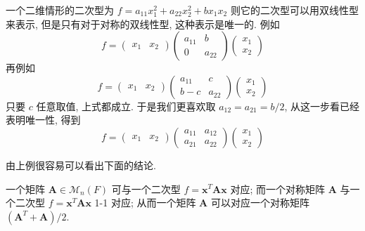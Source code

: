 \documentclass[UTF8]{book}
\begin{document}
\begin{example}
    一个二维情形的二次型为 $f=a_{11} x_1^2 + a_{22} x_2^2 + b x_1x_2$ 
    则它的二次型可以用双线性型来表示, 但是只有对于对称的双线性型, 
    这种表示是唯一的. 
    例如 
    \begin{equation*}
        f = 
        \begin{pmatrix}
            x_1 & x_2  
        \end{pmatrix}
        \begin{pmatrix}
            a_{11} & b \\
            0    & a_{22} 
        \end{pmatrix}
        \begin{pmatrix}
            x_1 \\
            x_2
        \end{pmatrix}
    \end{equation*}
    再例如 
    \begin{equation*}
        f = 
        \begin{pmatrix}
            x_1 & x_2  
        \end{pmatrix}
        \begin{pmatrix}
            a_{11} & c \\
            b-c    & a_{22} 
        \end{pmatrix}
        \begin{pmatrix}
            x_1 \\
            x_2
        \end{pmatrix}
    \end{equation*}
    只要 $c$ 任意取值, 上式都成立. 
    于是我们更喜欢取 $a_{12} = a_{21} = b/2$, 从这一步看已经表明唯一性, 
    得到 
    \begin{equation*}
        f = 
        \begin{pmatrix}
            x_1 & x_2  
        \end{pmatrix}
        \begin{pmatrix}
            a_{11} & a_{12} \\
            a_{21}    & a_{22} 
        \end{pmatrix}
        \begin{pmatrix}
            x_1 \\
            x_2
        \end{pmatrix}
    \end{equation*}
\end{example}

由上例很容易可以看出下面的结论. 
\begin{theorem}
    一个矩阵 $\boldsymbol{A} \in \mathcal{M}_n(F)$ 
    可与一个二次型 $ f = \boldsymbol{x}^T\boldsymbol{A}\boldsymbol{x}$ 
    对应; 
    而一个对称矩阵 $\boldsymbol{A}$ 与一个二次型 
    $ f = \boldsymbol{x}^T\boldsymbol{A}\boldsymbol{x}$ 1-1 对应; 
    从而一个矩阵 $\boldsymbol{A}$ 
    可以对应一个对称矩阵 $(\boldsymbol{A}^T +\boldsymbol{A})/2$. 
\end{theorem}
\end{document}
